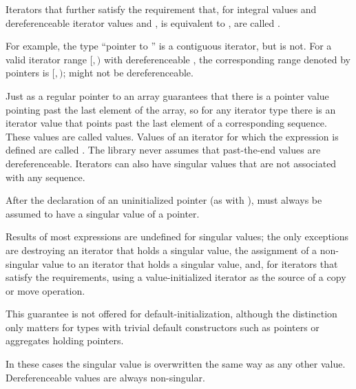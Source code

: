 \begin{removedblock}
\pnum
Iterators that further satisfy the requirement that,
for integral values  and
dereferenceable iterator values  and ,
 is equivalent to ,
are called .
\begin{note}
For example, the type ``pointer to '' is a contiguous iterator,
but  is not.
For a valid iterator range $[$$, $$)$ with dereferenceable ,
the corresponding range denoted by pointers is
$[$$, $$)$;
 might not be dereferenceable.
\end{note}
\end{removedblock}

\pnum
Just as a regular pointer to an array guarantees that there is a pointer value pointing past the last element
of the array, so for any iterator type there is an iterator value that points past the last element of a
corresponding sequence.
These values are called
values.
Values of an iterator
for which the expression
is defined are called
.
The library never assumes that past-the-end values are dereferenceable.
Iterators can also have singular values that are not associated with any
sequence.
\begin{example}
After the declaration of an uninitialized pointer
(as with
),
must always be assumed to have a singular value of a pointer.
\end{example}
Results of most expressions are undefined for singular values;
the only exceptions are destroying an iterator that holds a singular value,
the assignment of a non-singular value to
an iterator that holds a singular value, and, for iterators that satisfy the
 requirements, using a value-initialized iterator
as the source of a copy or move operation. \begin{note} This guarantee is not
offered for default-initialization, although the distinction only matters for types
with trivial default constructors such as pointers or aggregates holding pointers.
\end{note}
In these cases the singular
value is overwritten the same way as any other value.
Dereferenceable
values are always non-singular.

